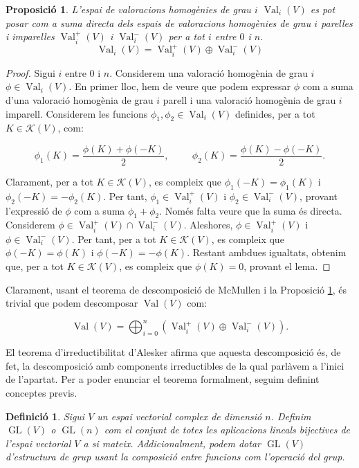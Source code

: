 \documentclass{article}
\newtheorem{definicio}{Definici\'{o}}
\newtheorem{proposicio}{Proposici\'{o}}
\theoremstyle{definition}
\DeclareMathOperator{\Val}{Val}
\DeclareMathOperator{\GL}{GL}
\begin{document}
\begin{proposicio}\label{prop:sumaval}
L'espai de valoracions homog\`{e}nies de grau $i$ $\Val_i(V)$ es pot posar com a suma directa dels espais de valoracions homog\`{e}nies de grau $i$ parelles i imparelles $\Val_i^+(V)$ i $\Val_i^-(V)$ per a tot $i$ entre $0$ i $n$.
\[\Val_i(V)= \Val_i^+(V) \oplus \Val_i^-(V)\]
\end{proposicio}

\begin{proof}
Sigui $i$ entre $0$ i $n$. Considerem una valoraci\'{o} homog\`{e}nia de grau $i$ $\phi \in \Val_i(V)$. En primer lloc, hem de veure que podem expressar $\phi$ com a suma d'una valoraci\'{o} homog\`{e}nia de grau $i$ parell i una valoraci\'{o} homog\`{e}nia de grau $i$ imparell. Considerem les funcions $\phi_1, \phi_2 \in \Val_i(V)$ definides, per a tot $K \in \mathcal{K}(V)$, com:

\[ \phi_1(K) = \frac{\phi(K) + \phi(-K)}{2}, \hspace{1cm} \phi_2(K) = \frac{\phi(K) - \phi(-K)}{2}.\]

Clarament, per a tot $K \in \mathcal{K}(V)$, es compleix que $\phi_1(-K) = \phi_1(K)$ i $\phi_2(-K) = - \phi_2(K)$. Per tant, $\phi_1 \in \Val_i^+(V)$ i $\phi_2 \in \Val_i^-(V)$, provant l'expressi\'{o} de $\phi$ com a suma $\phi_1 + \phi_2$. Nom\'{e}s falta veure que la suma \'{e}s directa. Considerem $\phi \in \Val_i^+(V) \cap \Val_i^-(V)$. Aleshores, $\phi \in \Val_i^+(V)$ i $\phi \in \Val_i^-(V)$. Per tant, per a tot $K \in \mathcal{K}(V)$, es compleix que $\phi(-K) = \phi(K)$ i $\phi(-K) = -\phi(K)$. Restant ambdues igualtats, obtenim que, per a tot $K \in \mathcal{K}(V)$, es compleix que $\phi(K) = 0$, provant el lema. 
\end{proof}

Clarament, usant el teorema de descomposici\'{o} de McMullen i la Proposici\'{o} \ref{prop:sumaval}, \'{e}s trivial que podem descomposar $\Val(V)$ com:

\[ \Val(V) = \bigoplus^n_{i=0} ( \Val_i^+(V) \oplus \Val_i^-(V)).\]

El teorema d'irreductibilitat d'Alesker afirma que aquesta descomposici\'{o} \'{e}s, de fet, la descomposici\'{o} amb components irreductibles de la qual parl\`{a}vem a l'inici de l'apartat. Per a poder enunciar el teorema formalment, seguim definint conceptes previs.

\begin{definicio}\label{Def:GL}
Sigui $V$ un espai vectorial complex de dimensi\'{o} $n$. Definim $\GL(V)$ o $\GL(n)$ com el conjunt de totes les aplicacions lineals bijectives de l'espai vectorial $V$ a si mateix. Addicionalment, podem dotar $\GL(V)$ d'estructura de grup usant la composici\'{o} entre funcions com l'operaci\'{o} del grup.
\end{definicio}
\end{document}
